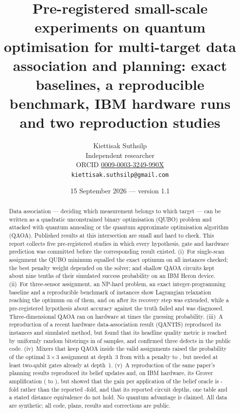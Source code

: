 \documentclass[11pt,a4paper]{article}
\title{Pre-registered small-scale experiments on quantum optimisation for multi-target data association and planning:
exact baselines, a reproducible benchmark, IBM hardware runs and two reproduction studies}
\author{Kiettisak Suthsilp\\
Independent researcher\\
ORCID \href{https://orcid.org/0009-0003-3249-990X}{0009-0003-3249-990X}\\
\texttt{kiettisak.suthsilp@gmail.com}}
\date{15 September 2026 --- version 1.1}
\begin{document}
\maketitle

\begin{abstract}
Data association --- deciding which measurement belongs to which target --- can be written as a quadratic unconstrained binary
optimisation (QUBO) problem and attacked with quantum annealing or the quantum approximate optimisation algorithm (QAOA).
Published results at this intersection are small and hard to check. This report collects five pre-registered studies in which every
hypothesis, gate and hardware prediction was committed before the corresponding result existed.
(i)~For single-scan assignment the QUBO minimum equalled the exact optimum on all \PoneGatePassed{} instances checked; the best
penalty weight depended on the solver; and shallow QAOA circuits kept about nine tenths of their simulated success probability on an
IBM Heron device.
(ii)~For three-sensor assignment, an NP-hard problem, an exact integer-programming baseline and a reproducible benchmark of
\PtwoBenchInstances{} instances show Lagrangian relaxation reaching the optimum on \PtwoBenchLR{} of them, and on \PtwoEightLROptimal{} after
its recovery step was extended, while a pre-registered hypothesis about accuracy against the truth failed and was diagnosed.
Three-dimensional QAOA ran on hardware at \PtwoSixBGuess{} times the guessing probability.
(iii)~A reproduction of a recent hardware data-association result (QANTIS) reproduced its instances and simulated method, but found
that its headline quality metric is reached by uniformly random bitstrings in \PthreeRandomAboveHeadline{} of samples, and
confirmed three defects in the public code.
(iv)~Mixers that keep QAOA inside the valid assignments raised the probability of the optimal $3\times3$ assignment at depth~3 from
\PfiveXpenPthree{} with a penalty to \PfivePermPthree, but needed at least \PfiveRxyCZ{} two-qubit gates already at depth~1.
(v)~A reproduction of the same paper's planning results reproduced its belief updates and, on IBM hardware, its Grover amplification
(\PsixHwBase{} to \PsixHwGrover), but showed that the gain per application of the belief oracle is \PsixHwPerOracle-fold rather
than the reported \PsixPaperAmp-fold, and that its reported circuit depths, one table and a stated distance equivalence do not hold.
No quantum advantage is claimed. All data are synthetic; all code, plans, results and corrections are public.
\end{abstract}
\end{document}

